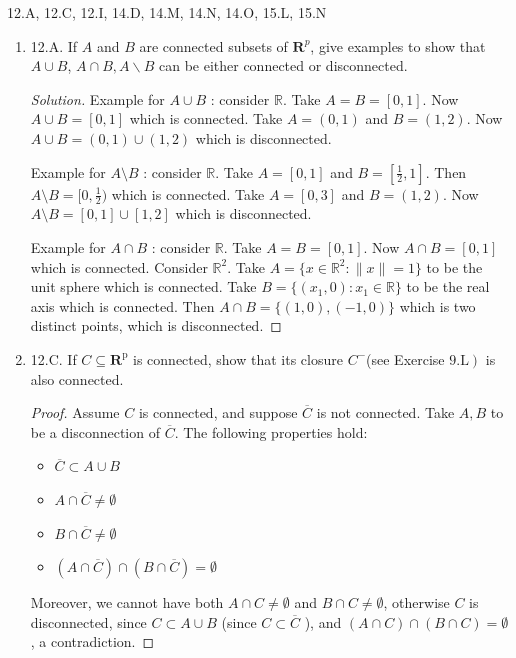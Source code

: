 
12.A, 12.C, 12.I, 14.D, 14.M, 14.N, 14.O, 15.L, 15.N
\begin{enumerate}
\item 12.A. If $A$ and $B$ are connected subsets of $\boldsymbol{R}^p$, give examples to show that $A \cup B$, $A \cap B, A \backslash B$ can be either connected or disconnected.
\begin{proof}[Solution]
	Example for $A \cup B$ : consider $\mathbb{R}$. Take $A = B = [0,1]$. Now $A \cup B = [0,1]$ which is connected. Take $A = (0,1)$ and $B = (1,2)$. Now $A \cup B = (0,1) \cup (1,2)$ which is disconnected.

	Example for $A \setminus B$ : consider $\mathbb{R}$. Take $A = [0,1]$ and $B = [\frac{1}{2}, 1]$. Then $A \setminus B = [0,\frac{1}{2})$ which is connected. Take $A = [0,3]$ and $B = (1,2)$. Now $A\setminus B = [0,1] \cup [1,2]$ which is disconnected.
	
	Example for $A \cap B$ : consider $\mathbb{R}$. Take $A = B = [0,1]$. Now $A \cap B = [0,1] $ which is connected. Consider $\mathbb{R}^2$. Take $A = \{x \in \mathbb{R}^2: \|x\| = 1\} $ to be the unit sphere which is connected. Take $B = \{(x_1,0): x_1 \in \mathbb{R}\} $ to be the real axis which is connected. Then $A \cap B = \{(1,0), (-1,0)\} $ which is two distinct points, which is disconnected.
\end{proof}

\item 12.C. If $C \subseteq \mathbf{R}^{\mathrm{p}}$ is connected, show that its closure $C^{-}$(see Exercise $\left.9 . \mathrm{L}\right)$ is also connected.
\begin{proof}
	Assume $C$ is connected, and suppose $\overline{C} $ is not connected. Take $A,B$ to be a disconnection of $\overline{C} $. The following properties hold:
	\begin{itemize}
		\item $\overline{C}  \subset A \cup B$
		\item $A \cap \overline{C}  \neq \emptyset $
		\item $B \cap \overline{C}  \neq \emptyset $
		\item $(A \cap \overline{C} ) \cap (B \cap \overline{C} ) = \emptyset $
	\end{itemize}

	Moreover, we cannot have both $A \cap C\neq \emptyset $ and $B \cap C \neq \emptyset $, otherwise $C$ is disconnected, since $C \subset A \cup B$ (since $C \subset \overline{C} $ ), and $(A \cap C) \cap (B \cap C) = \emptyset $, a contradiction.


\end{proof}
\end{enumerate}
